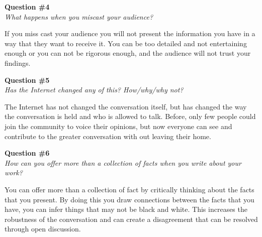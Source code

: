 \documentclass[11pt]{article}
\numberwithin{equation}{section}
\begin{document}
\textbf{Question \#4}\\
\indent \textit{\indent What happens when you miscast your audience?}

If you miss cast your audience you will not present the information you have in a way that they want to receive it. You can be too detailed and not entertaining enough or you can not be rigorous enough, and the audience will not trust your findings.

\textbf{Question \#5}\\
\indent \textit{\indent Has the Internet changed any of this? How/why/why not?}

The Internet has not changed the conversation itself, but has changed the way the conversation is held and who is allowed to talk. Before, only few people could join the community to voice their opinions, but now everyone can see and contribute to the greater conversation with out leaving their home.

\textbf{Question \#6}\\
\indent \textit{\indent How can you offer more than a collection of facts when you write about your work?}

You can offer more than a collection of fact by critically thinking about the facts that you present. By doing this you draw connections between the facts that you have, you can infer things that may not be black and white. This increases the robustness of the conversation and can create a disagreement that can be resolved through open discussion.
\end{document}
